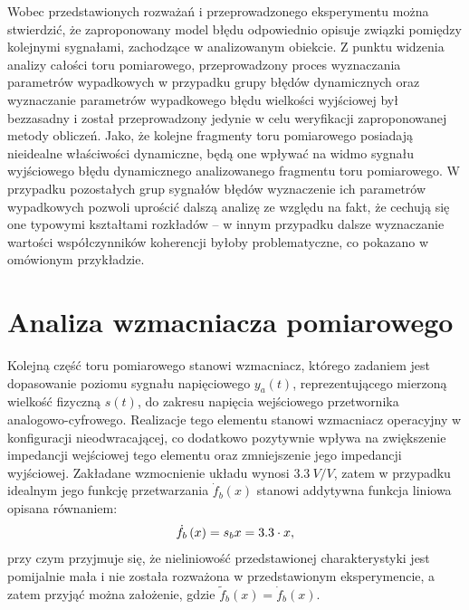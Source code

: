 Wobec przedstawionych rozważań i przeprowadzonego eksperymentu można stwierdzić, że zaproponowany model błędu odpowiednio opisuje związki pomiędzy kolejnymi sygnałami, zachodzące w analizowanym obiekcie. Z punktu widzenia analizy całości toru pomiarowego, przeprowadzony proces wyznaczania parametrów wypadkowych w przypadku grupy błędów dynamicznych oraz wyznaczanie parametrów wypadkowego błędu wielkości wyjściowej był bezzasadny i został przeprowadzony jedynie w celu weryfikacji zaproponowanej metody obliczeń. Jako, że kolejne fragmenty toru pomiarowego posiadają nieidealne właściwości dynamiczne, będą one wpływać na widmo sygnału wyjściowego błędu dynamicznego analizowanego fragmentu toru pomiarowego. W przypadku pozostałych grup sygnałów błędów wyznaczenie ich parametrów wypadkowych pozwoli uprościć dalszą analizę ze względu na fakt, że cechują się one typowymi kształtami rozkładów -- w innym przypadku dalsze wyznaczanie wartości współczynników koherencji byłoby problematyczne, co pokazano w omówionym przykładzie.

\section{Analiza wzmacniacza pomiarowego}

Kolejną część toru pomiarowego stanowi wzmacniacz, którego zadaniem jest dopasowanie poziomu sygnału napięciowego $y_{a}(t)$, reprezentującego mierzoną wielkość fizyczną $s(t)$, do zakresu napięcia wejściowego przetwornika analogowo-cyfrowego. Realizacje tego elementu stanowi wzmacniacz operacyjny w konfiguracji nieodwracającej, co dodatkowo pozytywnie wpływa na zwiększenie impedancji wejściowej tego elementu oraz zmniejszenie jego impedancji wyjściowej. Zakładane wzmocnienie układu wynosi $\qty{3.3}{V \per V}$, zatem w przypadku idealnym jego funkcję przetwarzania $\dot{f}_{b}(x)$ stanowi addytywna funkcja liniowa opisana równaniem:
\begin{equation}
\dot{f}_{b} \left(x\right) = s_{b} x = 3.3 \cdot x \label{eq:sym_partb_function},
\end{equation}
przy czym przyjmuje się, że nieliniowość przedstawionej charakterystyki jest pomijalnie mała i nie została rozważona w przedstawionym eksperymencie, a zatem przyjąć można założenie, gdzie $\tilde{f}_{b}(x) = \dot{f}_{b}(x)$.

